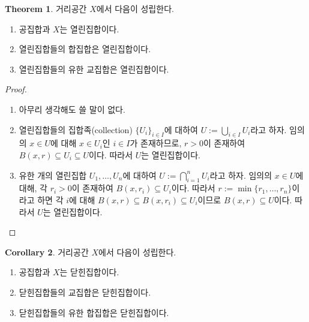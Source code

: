 \documentclass[11pt]{book}
\numberwithin{equation}{chapter}
\theoremstyle{definition}
\newtheorem{thm}{Theorem}[section]
\newtheorem{cor}[thm]{Corollary}
\begin{document}
\begin{thm}
    거리공간 \(X\)에서 다음이 성립한다.
    \begin{enumerate} [label=(\alph*), leftmargin=2\parindent]
        \item 공집합과 \(X\)는 열린집합이다.
        \item 열린집합들의 합집합은 열린집합이다.
        \item 열린집합들의 유한 교집합은 열린집합이다.
    \end{enumerate}
\end{thm}
\begin{proof}
    \quad

    \begin{enumerate} [label=(\alph*), leftmargin=2\parindent]
        \item 아무리 생각해도 쓸 말이 없다.
        \item 열린집합들의 집합족(collection) \(\{U_i\}_{i \in I}\)에 대하여 \(U := \bigcup_{i \in I} U_i\)라고 하자. 임의의 \(x \in U\)에 대해 \(x \in U_i\)인 \(i \in I\)가 존재하므로, \(r > 0\)이 존재하여 \(B(x, r) \subseteq U_i \subseteq U\)이다. 따라서 \(U\)는 열린집합이다.
        \item 유한 개의 열린집합 \(U_1, \ldots, U_n\)에 대하여 \(U := \bigcap_{i =1}^n U_i\)라고 하자. 임의의 \(x \in U\)에 대해, 각 \(r_i > 0\)이 존재하여 \(B(x, r_i) \subseteq U_i\)이다. 따라서 \(r := \min\{r_1, \ldots, r_n\}\)이라고 하면 각 \(i\)에 대해 \(B(x, r) \subseteq B(x, r_i) \subseteq U_i\)이므로 \(B(x, r) \subseteq U\)이다. 따라서 \(U\)는 열린집합이다.
    \end{enumerate}
\end{proof}

\begin{cor}
    거리공간 \(X\)에서 다음이 성립한다.
    \begin{enumerate} [label=(\alph*), leftmargin=2\parindent]
        \item 공집합과 \(X\)는 닫힌집합이다.
        \item 닫힌집합들의 교집합은 닫힌집합이다.
        \item 닫힌집합들의 유한 합집합은 닫힌집합이다.
    \end{enumerate}
\end{cor}
\end{document}
